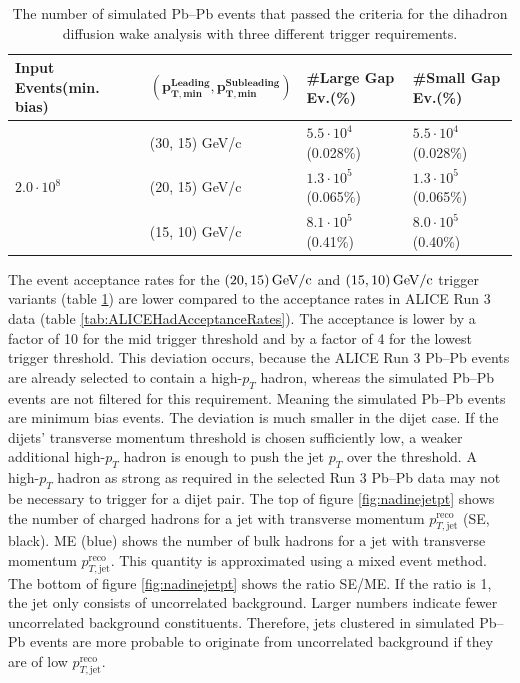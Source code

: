 \documentclass[
  a4paper,
  12pt,
  oneside,
  parskip=half,
  listof=totoc,
  bibliography=totoc,
  DIV=12,
  numbers=noenddot,
  BA.tex
  ]{subfiles}
\begin{document}
\begin{table}[H]
	\begin{footnotesize}
		\begin{tabular}{llll}
			\hline
			\textbf{Input Events(min. bias)} & $\mathbf{(p_{T,\textbf{min}}^\textbf{Leading}, p_{T,\textbf{min}}^\textbf{Subleading})}$ & \textbf{\#Large Gap Ev.(\%)} & \textbf{\#Small Gap Ev.(\%)} \\
			\hline
			\multirow{3}{*}{$2.0 \cdot 10^8$}   & (30, 15) GeV/c    & $5.5\cdot 10^4$(0.028\%)                       & $5.5\cdot 10^4$(0.028\%)                       \\
			& (20, 15) GeV/c    &          $1.3\cdot 10^5$(0.065\%)                   &          $1.3\cdot 10^5$(0.065\%)                   \\
			& (15, 10) GeV/c    &           $8.1\cdot 10^5$(0.41\%)                  &             $8.0\cdot 10^5$(0.40\%)               \\
			\hline
		\end{tabular}
	\end{footnotesize}
	\caption{The number of simulated Pb--Pb events that passed the criteria for the dihadron diffusion wake analysis with three different trigger requirements.}
	\label{tab:SimHadAcceptance}
\end{table}

The event acceptance rates for the $(20, 15)\bunit{GeV/c}$ and $(15,10)\bunit{GeV/c}$ trigger variants (table \ref{tab:SimHadAcceptance}) are lower compared to the acceptance rates in ALICE Run 3 data (table \ref{tab:ALICEHadAcceptanceRates}). The acceptance is lower by a factor of 10 for the mid trigger threshold and by a factor of 4 for the lowest trigger threshold. This deviation occurs, because the ALICE Run 3 Pb--Pb events are already selected to contain a high-$p_T$ hadron, whereas the simulated Pb--Pb events are not filtered for this requirement. Meaning the simulated Pb--Pb events are minimum bias events. The deviation is much smaller in the dijet case. If the dijets' transverse momentum threshold is chosen sufficiently low, a weaker additional high-$p_T$ hadron is enough to push the jet $p_T$ over the threshold. A high-$p_T$ hadron as strong as required in the selected Run 3 Pb--Pb data may not be necessary to trigger for a dijet pair. The top of figure \ref{fig:nadinejetpt} shows the number of charged hadrons for a jet with transverse momentum $p_{T,\text{jet}}^\text{reco}$ (SE, black). ME (blue) shows the number of bulk hadrons for a jet with transverse momentum $p_{T,\text{jet}}^\text{reco}$. This quantity is approximated using a mixed event method. The bottom of figure \ref{fig:nadinejetpt} shows the ratio SE/ME. If the ratio is 1, the jet only consists of uncorrelated background. Larger numbers indicate fewer uncorrelated background constituents. Therefore, jets clustered in simulated Pb--Pb events are more probable to originate from uncorrelated background if they are of low $p_{T,\text{jet}}^\text{reco}$.
\end{document}
